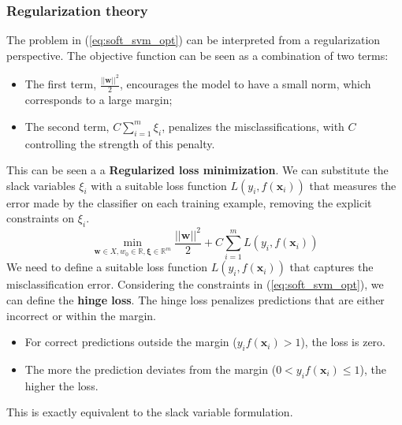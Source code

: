 \subsubsection{Regularization theory}
The problem in (\ref{eq:soft_svm_opt}) can be interpreted from a regularization perspective.
The objective function can be seen as a combination of two terms:
\begin{itemize}
    \item The first term, $\frac{||\boldsymbol{w}||^2}{2}$, encourages the model to have a small norm, which corresponds to a large margin;
    \item The second term, $C \sum_{i=1}^{m} \xi_i$, penalizes the misclassifications, with $C$ controlling the strength of this penalty.
\end{itemize}
This can be seen a a \textbf{Regularized loss minimization}. 
We can substitute the slack variables $\xi_i$ with a suitable loss function $L(y_i, f(\boldsymbol{x}_i))$ 
that measures the error made by the classifier on each training example, removing the explicit constraints on $\xi_i$.
\begin{equation}
    \min_{\boldsymbol{w} \in X, w_0 \in \mathbb{R}, \boldsymbol{\xi} \in \mathbb{R}^m} \frac{||\boldsymbol{w}||^2}{2} + C \sum_{i=1}^{m} L(y_i, f(\boldsymbol{x}_i))
\end{equation}
We need to define a suitable loss function $L(y_i, f(\boldsymbol{x}_i))$ that captures the misclassification error.
Considering the constraints in (\ref{eq:soft_svm_opt}), we can define the \textbf{hinge loss}.
The hinge loss penalizes predictions that are either incorrect or within the margin. 
\begin{itemize}
    \item For correct predictions outside the margin ($y_i f(\boldsymbol{x}_i) > 1$), the loss is zero.
    \item The more the prediction deviates from  the margin ($0 < y_i f(\boldsymbol{x}_i) \leq 1$), the higher the loss.
\end{itemize}
This is exactly equivalent to the slack variable formulation.


